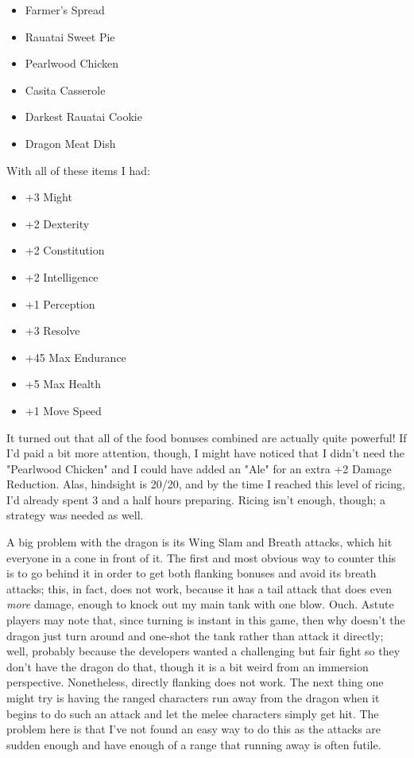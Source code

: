 \documentclass{article}
\begin{document}
\begin{itemize}
	\item Farmer's Spread
	\item Rauatai Sweet Pie
	\item Pearlwood Chicken
	\item Casita Casserole
	\item Darkest Rauatai Cookie
	\item Dragon Meat Dish
\end{itemize}
With all of these items I had:
\begin{itemize}
	\item +3 Might
	\item +2 Dexterity
	\item +2 Constitution
	\item +2 Intelligence
	\item +1 Perception
	\item +3 Resolve
	\item +45 Max Endurance
	\item +5 Max Health
	\item +1 Move Speed
\end{itemize}
It turned out that all of the food bonuses combined are actually quite powerful!  If I'd paid a bit more attention, though, I might have noticed that I didn't need the "Pearlwood Chicken" and I could have added an "Ale" for an extra +2 Damage Reduction.  Alas, hindsight is 20/20, and by the time I reached this level of ricing, I'd already spent 3 and a half hours preparing.  Ricing isn't enough, though; a strategy was needed as well.

A big problem with the dragon is its Wing Slam and Breath attacks, which hit everyone in a cone in front of it.  The first and most obvious way to counter this is to go behind it in order to get both flanking bonuses and avoid its breath attacks; this, in fact, does not work, because it has a tail attack that does even \emph{more} damage, enough to knock out my main tank with one blow.  Ouch.  Astute players may note that, since turning is instant in this game, then why doesn't the dragon just turn around and one-shot the tank rather than attack it directly; well, probably because the developers wanted a challenging but fair fight so they don't have the dragon do that, though it is a bit weird from an immersion perspective.  Nonetheless, directly flanking does not work.  The next thing one might try is having the ranged characters run away from the dragon when it begins to do such an attack and let the melee characters simply get hit.  The problem here is that I've not found an easy way to do this as the attacks are sudden enough and have enough of a range that running away is often futile.
\end{document}
